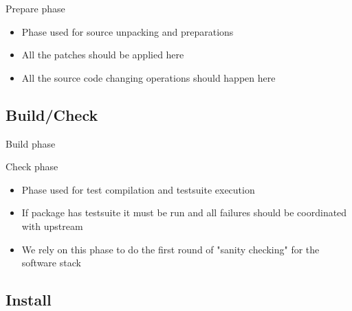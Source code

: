 \documentclass{beamer}
\begin{document}
\begin{frame}[t]{Prepare phase}
	\begin{itemize}
	\item Phase used for source unpacking and preparations
    \item All the patches should be applied here
    \item All the source code changing operations should happen here
	\end{itemize}
\end{frame}

\subsection{Build/Check}

\begin{frame}[fragile]{Build phase}
\end{frame}

\begin{frame}[t]{Check phase}
	\begin{itemize}
	\item Phase used for test compilation and testsuite execution
    \item If package has testsuite it must be run and all failures should be coordinated with upstream
    \item We rely on this phase to do the first round of "sanity checking" for the software stack
	\end{itemize}
\end{frame}

\subsection{Install}
\end{document}
